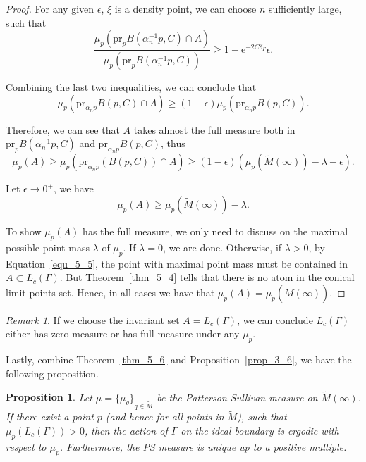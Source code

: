 \documentclass[reqno,11pt]{article}
\newtheorem{proposition}[theorem]{Proposition}
\theoremstyle{definition}
\theoremstyle{remark}
\newtheorem*{remark}{Remark}
\numberwithin{equation}{section}
\begin{document}
\begin{proof}
	For any given $\epsilon$, $\xi$ is a density point, we can choose $n$ sufficiently large, such that
	\begin{displaymath}
		\frac{\mu_p(\text{pr}_p B(\alpha_n^{-1}p,C)\cap A)}{\mu_p(\text{pr}_p B(\alpha_n^{-1}p,C))}\geq 1-\mathrm{e}^{-2C\delta_\Gamma}\epsilon.
	\end{displaymath}

	Combining the last two inequalities, we can conclude that
	\begin{displaymath}
		\mu_p(\text{pr}_{\alpha_n p}B(p,C)\cap A)\geq (1-\epsilon)\mu_p(\text{pr}_{\alpha_n p}B(p,C)).
	\end{displaymath}

	Therefore, we can see that $A$ takes almost the full measure both in $\text{pr}_p B(\alpha_n^{-1}p, C)$ and $\text{pr}_{\alpha_n p}B(p,C)$, thus
	\begin{displaymath}
		\mu_p(A)\geq\mu_p(\text{pr}_{\alpha_n p}(B(p,C))\cap A)\geq(1-\epsilon)(\mu_p(\widetilde{M}(\infty))-\lambda-\epsilon).
	\end{displaymath}

	Let $\epsilon\to 0^+$, we have
	\begin{equation}\label{equ_5_5}
		\mu_p(A)\geq\mu_p(\widetilde{M}(\infty))-\lambda.
	\end{equation}

	To show $\mu_p(A)$ has the full measure, we only need to discuss on the maximal possible point mass $\lambda$ of $\mu_p$. If $\lambda=0$, we are done. Otherwise, if $\lambda>0$, by Equation~\ref{equ_5_5}, the point with maximal point mass must be contained in $A\subset L_c(\Gamma)$. But Theorem~\ref{thm_5_4} tells that there is no atom in the conical limit points set. Hence, in all cases we have that $\mu_p(A)=\mu_p(\widetilde{M}(\infty))$.
\end{proof}

\begin{remark}
	If we choose the invariant set $A=L_c(\Gamma)$, we can conclude $L_c(\Gamma)$ either has zero measure or has full measure under any $\mu_p$.
\end{remark}

Lastly, combine Theorem~\ref{thm_5_6} and Proposition~\ref{prop_3_6}, we have the following proposition.

\begin{proposition}\label{prop_5_7}
    Let $\mu={\{\mu_q\}}_{q\in\widetilde{M}}$ be the Patterson-Sullivan measure on $\widetilde{M}(\infty)$. If there exist a point $p$ (and hence for all points in $\widetilde{M}$), such that $\mu_p(L_c(\Gamma))>0$, then the action of $\Gamma$ on the ideal boundary is ergodic with respect to $\mu_p$. Furthermore, the PS measure is unique up to a positive multiple.
\end{proposition}
\end{document}
